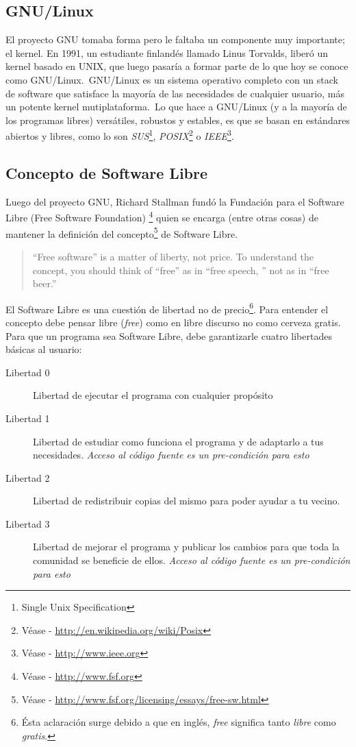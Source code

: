 \subsection{GNU/Linux}
El proyecto GNU tomaba forma pero le faltaba un componente muy importante; el
kernel. 
En 1991, un estudiante finland\'es llamado Linus Torvalds, liber\'o un kernel
basado en UNIX, que luego pasar\'ia a formar parte de lo que hoy se conoce como
GNU/Linux.\
GNU/Linux es un sistema operativo completo con un stack de software que
satisface la mayor\'ia de las necesidades de cualquier usuario, m\'as un
potente kernel mutiplataforma.\
Lo que hace a GNU/Linux (y a la mayor\'ia de los programas libres)
vers\'atiles,
robustos y estables, es que se basan en est\'andares abiertos y libres, como lo
son \emph{SUS}\footnote{Single Unix Specification},
\emph{POSIX}\footnote{V\'ease - \url{http://en.wikipedia.org/wiki/Posix}} o
\emph{IEEE}\footnote{V\'ease - \url{http://www.ieee.org}}.

\subsection{Concepto de Software Libre}
Luego del proyecto GNU, Richard Stallman fund\'o la Fundaci\'on para el 
Software Libre (Free Software Foundation)
\footnote{V\'ease - \url{http://www.fsf.org}} quien se encarga (entre otras
cosas) de
mantener la definici\'on del concepto\footnote{V\'ease -
\url{http://www.fsf.org/licensing/essays/free-sw.html}} de Software Libre.

\begin{quote}
``Free software'' is a matter of liberty, not price. 
To understand the concept, you should think of ``free'' as in ``free speech,
'' not as in ``free beer.''
\end{quote}

El Software Libre es una cuesti\'on de libertad no de precio\footnote{\'Esta
aclaraci\'on surge debido a que en ingl\'es, \emph{free} significa tanto
\emph{libre} como \emph{gratis}.}. Para entender el concepto debe pensar libre
(\emph{free}) como en libre discurso no como cerveza gratis.\\

Para que un programa sea Software Libre, debe garantizarle cuatro libertades
b\'asicas al usuario:

\begin{description}
\item[Libertad 0] Libertad de ejecutar el programa con cualquier prop\'osito
\item[Libertad 1] Libertad de estudiar como funciona el programa y de
adaptarlo
a tus necesidades. \emph{Acceso al c\'odigo fuente es un pre-condici\'on para
esto}
\item[Libertad 2] Libertad de redistribuir copias del mismo para poder ayudar
a tu vecino.
\item[Libertad 3] Libertad de mejorar el programa y publicar los cambios para
que toda la comunidad se beneficie de ellos. \emph{Acceso al c\'odigo fuente
es un pre-condici\'on para esto}
\end{description}



